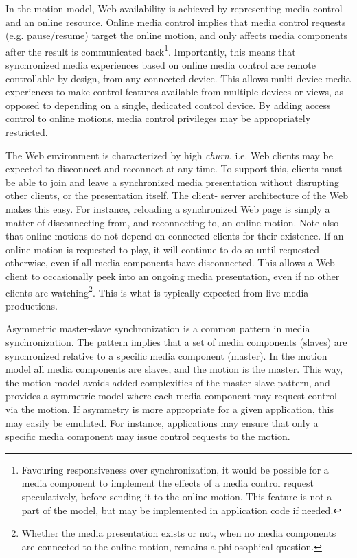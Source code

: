 
In the motion model, Web availability is achieved by representing media
control and an online resource. Online media control implies that media
control requests (e.g. pause/resume) target the online motion, and only
affects media components after the result is communicated
back\footnote{Favouring responsiveness over synchronization, it would be
possible for a media component to implement the effects of a media control
request speculatively, before sending it to the online motion. This feature is
not a part of the model, but may be implemented in application code if needed.
}. Importantly, this means that synchronized media experiences based on online
media control are remote controllable by design, from any connected device.
This allows multi-device media experiences to make control features available
from multiple devices or views, as opposed to depending on a single, dedicated
control device. By adding access control to online motions, media control
privileges may be appropriately restricted.



The Web environment is characterized by high \emph{churn}, i.e. Web clients
may be expected to disconnect and reconnect at any time. To support this,
clients must be able to join and leave a synchronized media presentation
without disrupting other clients, or the presentation itself. The client-
server architecture of the Web makes this easy. For instance, reloading a
synchronized Web page is simply a matter of disconnecting from, and
reconnecting to, an online motion. Note also that online motions do not depend
on connected clients for their existence. If an online motion is requested to
play, it will continue to do so until requested otherwise, even if all media
components have disconnected. This allows a Web client to occasionally peek
into an ongoing media presentation, even if no other clients are
watching\footnote{Whether the media presentation exists or not, when no media
components are connected to the online motion, remains a philosophical
question.}. This is what is typically expected from live media productions.



Asymmetric master-slave synchronization is a common pattern in media
synchronization. The pattern implies that a set of media components (slaves)
are synchronized relative to a specific media component (master). In the
motion model all media components are slaves, and the motion is the master.
This way, the motion model avoids added complexities of the master-slave
pattern, and provides a symmetric model where each media component may request
control via the motion. If asymmetry is more appropriate for a given
application, this may easily be emulated. For instance, applications may
ensure that only a specific media component may issue control requests to the
motion.

